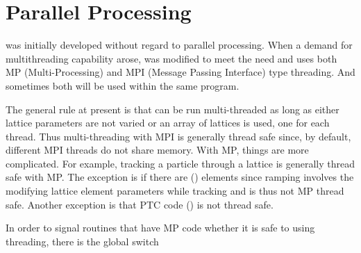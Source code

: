 {{{{{{{{{{{%
\section{Parallel Processing}
\label{s:parallel.proc}

\bmad was initially developed without regard to parallel processing. When a demand for
multithreading capability arose, \bmad was modified to meet the need and uses both MP
(Multi-Processing) and MPI (Message Passing Interface) type threading. And sometimes both will be
used within the same program.

The general rule at present is that \bmad can be run multi-threaded as long as either lattice
parameters are not varied or an array of lattices is used, one for each thread. Thus multi-threading
with MPI is generally thread safe since, by default, different MPI threads do not share memory. With
MP, things are more complicated.  For example, tracking a particle through a lattice is generally
thread safe with MP. The exception is if there are  () elements since
ramping involves the modifying lattice element parameters while tracking and is thus not MP thread
safe. Another exception is that PTC code () is not thread safe.

In order to signal routines that have MP code whether it is safe to using threading, there is the
global switch \vn{global_com%

\section{Expression Trees and Expression Stacks}

Expression trees and expression stacks are how \bmad and \tao handle arithmetical expressions. There
is a bit of history here. Originally, there was only expression stacks. An expression stack is an
array of \vn{expression_atom_struct}s. The main routines to manipulate stacks are:
\begin{example}
  expression_string_to_stack  ! Convert expression string to a reverse Polish stack.
  express_stack_value         ! Evaluate expression stack.
  expression_value            ! Combines expression_string_to_stack and expression_stack_value.
  expression_stack_to_string  ! Creates an expression string from a stack.
\end{example}

}}}}}}}}}}}}
